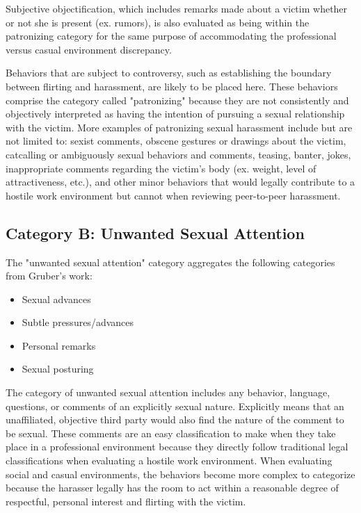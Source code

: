 Subjective objectification, which includes remarks made about a victim whether or not she is present (ex. rumors), is also evaluated as being within the patronizing category for the same purpose of accommodating the professional versus casual environment discrepancy.

Behaviors that are subject to controversy, such as establishing the boundary between flirting and harassment, are likely to be placed here. These behaviors comprise the category called "patronizing" because they are not consistently and objectively interpreted as having the intention of pursuing a sexual relationship with the victim. More examples of patronizing sexual harassment include but are not limited to: sexist comments, obscene gestures or drawings about the victim, catcalling or ambiguously sexual behaviors and comments, teasing, banter, jokes, inappropriate comments regarding the victim's body (ex. weight, level of attractiveness, etc.), and other minor behaviors that would legally contribute to a hostile work environment but cannot when reviewing peer-to-peer harassment.

\subsection{Category B: Unwanted Sexual Attention}

The "unwanted sexual attention" category aggregates the following categories from Gruber's work:

\begin{itemize}
    \item Sexual advances
    \item Subtle pressures/advances
    \item Personal remarks
    \item Sexual posturing
\end{itemize}

The category of unwanted sexual attention includes any behavior, language, questions, or comments of an explicitly sexual nature. Explicitly means that an unaffiliated, objective third party would also find the nature of the comment to be sexual. These comments are an easy classification to make when they take place in a professional environment because they directly follow traditional legal classifications when evaluating a hostile work environment. When evaluating social and casual environments, the behaviors become more complex to categorize because the harasser legally has the room to act within a reasonable degree of respectful, personal interest and flirting with the victim.

